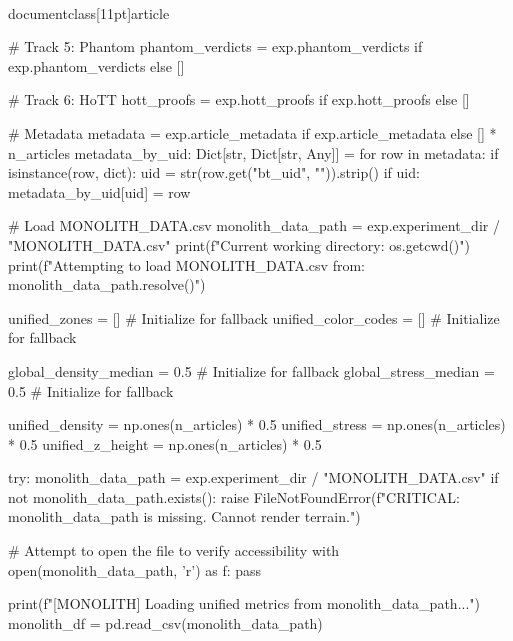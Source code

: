 \\documentclass[11pt]{article}
\begin{document}
\begin{CodeBlock}
{{{{{    # Track 5: Phantom
    phantom_verdicts = exp.phantom_verdicts if exp.phantom_verdicts else []

    # Track 6: HoTT
    hott_proofs = exp.hott_proofs if exp.hott_proofs else []

    # Metadata
    metadata = exp.article_metadata if exp.article_metadata else [{}] * n_articles
    metadata_by_uid: Dict[str, Dict[str, Any]] = {}
    for row in metadata:
        if isinstance(row, dict):
            uid = str(row.get("bt_uid", "")).strip()
            if uid:
                metadata_by_uid[uid] = row

    # Load MONOLITH_DATA.csv
    monolith_data_path = exp.experiment_dir / "MONOLITH_DATA.csv"
    print(f"Current working directory: {os.getcwd()}")
    print(f"Attempting to load MONOLITH_DATA.csv from: {monolith_data_path.resolve()}")

    unified_zones = [] # Initialize for fallback
    unified_color_codes = [] # Initialize for fallback

    global_density_median = 0.5 # Initialize for fallback
    global_stress_median = 0.5  # Initialize for fallback

    unified_density = np.ones(n_articles) * 0.5
    unified_stress = np.ones(n_articles) * 0.5
    unified_z_height = np.ones(n_articles) * 0.5

    try:
        monolith_data_path = exp.experiment_dir / "MONOLITH_DATA.csv"
        if not monolith_data_path.exists():
            raise FileNotFoundError(f"CRITICAL: {monolith_data_path} is missing. Cannot render terrain.")

        # Attempt to open the file to verify accessibility
        with open(monolith_data_path, 'r') as f:
            pass 

        print(f"[MONOLITH] Loading unified metrics from {monolith_data_path}...")
        monolith_df = pd.read_csv(monolith_data_path)

}}}}}
\end{CodeBlock}
\end{document}
